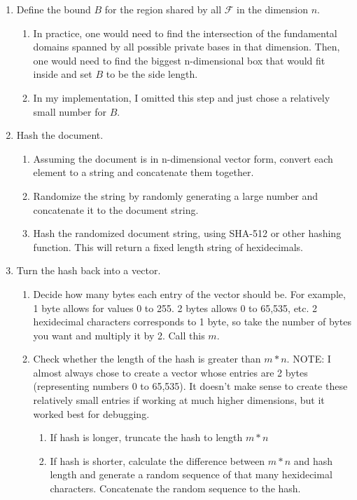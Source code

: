 \documentclass[11pt,reqno]{amsart}
\theoremstyle{definition}
\begin{document}
\begin{enumerate}
    \item Define the bound $B$ for the region shared by all $\mathcal{F}$ in the dimension $n$. 
    \begin{enumerate}
        \item In practice, one would need to find the intersection of the fundamental domains spanned by all possible private bases in that dimension. Then, one would need to find the biggest n-dimensional box that would fit inside and set $B$ to be the side length.
        \item In my implementation, I omitted this step and just chose a relatively small number for $B$.
    \end{enumerate}
    \item Hash the document.
    \begin{enumerate}
        \item Assuming the document is in n-dimensional vector form, convert each element to a string and concatenate them together. 
        \item Randomize the string by randomly generating a large number and concatenate it to the document string.
        \item Hash the randomized document string, using SHA-512 or other hashing function. This will return a fixed length string of hexidecimals.
    \end{enumerate}
    \item Turn the hash back into a vector.
    \begin{enumerate}
        \item Decide how many bytes each entry of the vector should be. For example, 1 byte allows for values 0 to 255. 2 bytes allows 0 to 65,535, etc. 2 hexidecimal characters corresponds to 1 byte, so take the number of bytes you want and multiply it by 2. Call this $m$.
        \item Check whether the length of the hash is greater than $m*n$. NOTE: I almost always chose to create a vector whose entries are 2 bytes (representing numbers 0 to 65,535). It doesn't make sense to create these relatively small entries if working at much higher dimensions, but it worked best for debugging. 
        \begin{enumerate}
            \item If hash is longer, truncate the hash to length $m*n$
            \item If hash is shorter, calculate the difference between $m*n$ and hash length and generate a random sequence of that many hexidecimal characters. Concatenate the random sequence to the hash.

\end{enumerate}
\end{enumerate}
\end{enumerate}
\end{document}
